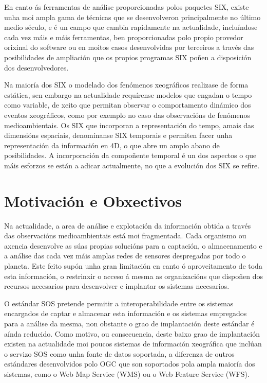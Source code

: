 En canto ás ferramentas de análise proporcionadas polos paquetes SIX, existe unha moi ampla gama de técnicas que se desenvolveron principalmente no último medio século, e é un campo que cambia rapidamente na actualidade, incluíndose cada vez máis e máis ferramentas, ben proporcionadas polo propio provedor orixinal do software ou en moitos casos desenvolvidas por terceiros a través das posibilidades de ampliación que os propios programas SIX poñen a disposición dos desenvolvedores.

Na maioría dos SIX o modelado dos fenómenos xeográficos realizase de forma estática, sen embargo na actualidade requírense modelos que engadan o tempo como variable, de xeito que permitan observar o comportamento dinámico dos eventos xeográficos, como por exemplo no caso das observacións de fenómenos medioambientais. Os SIX que incorporan a representación do tempo, amais das dimensións espaciais, denomínanse SIX temporais e permiten facer unha representación da información en 4D, o que abre un amplo abano de posibilidades. A incorporación da compoñente temporal é un dos aspectos o que máis esforzos se están a adicar actualmente, no que a evolución dos SIX se refire.

\section{Motivación e Obxectivos}

Na actualidade, a area de análise e explotación da información obtida a través das observacións medioambientais está moi fragmentada. Cada organismo ou axencia desenvolve as súas propias solucións para a captación, o almacenamento e a análise das cada vez máis amplas redes de sensores despregadas por todo o planeta. Este feito supón unha gran limitación en canto ó aproveitamento de toda esta información, o restrinxir o acceso á mesma as organizacións que dispoñen dos recursos necesarios para desenvolver e implantar os sistemas necesarios.

O estándar SOS pretende permitir a interoperabilidade entre os sistemas encargados de captar e almacenar esta información e os sistemas empregados para a análise da mesma, non obstante o grao de implantación deste estándar é aínda reducido. Como motivo, ou consecuencia, deste baixo grao de implantación existen na actualidade moi poucos sistemas de información xeográfica que inclúan o servizo SOS como unha fonte de datos soportada, a diferenza de outros estándares desenvolvidos polo OGC que son soportados pola ampla maioría dos sistemas, como o Web Map Service (WMS) ou o Web Feature Service (WFS).

